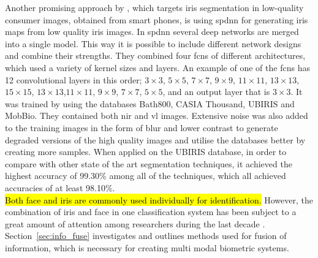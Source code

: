 Another promising approach by \cite{Bazrafkan2017}, which targets iris segmentation in low-quality consumer images, obtained from smart phones, is using \gls{spdnn} for generating iris maps from low quality iris images.  In \gls{spdnn} several deep networks are merged into a single model. This way it is possible to include different network designs and combine their strengths. They combined four \gls{fcn}s of different architectures, which used a variety of kernel sizes and layers. An example of one of the \gls{fcn}s has 12 convolutional layers in this order; $3\times3$, $5\times5$, $7\times7$, $9\times9$, $11\times11$, $13\times13$, $15\times15$, $13\times13$,$11\times11$, $9\times9$, $7\times7$, $5\times5$, and an output layer that is $3\times3$. It was trained by using the databases Bath800, CASIA Thousand, UBIRIS and MobBio. They contained both \gls{nir} and \gls{vl} images. Extensive noise was also added to the training images in the form of blur and lower contrast to generate degraded versions of the high quality images and utilise the databases better by creating more samples. When applied on the UBIRIS database, in order to compare with other state of the art segmentation techniques, it achieved the highest accuracy of 99.30\% among all of the techniques, which all achieved accuracies of at least 98.10\%.\\

\hl{Both face and iris are commonly used individually for identification.} However, the combination of iris and face in one classification system has been subject to a great amount of attention among researchers during the last decade \citep{Al-Waisy2017a}. Section~\ref{sec:info_fuse} investigates and outlines methods used for fusion of  information, which is necessary for creating multi modal biometric systems.  











